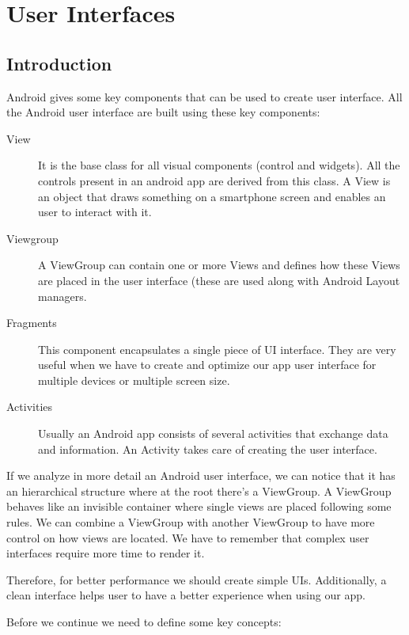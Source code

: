 \chapter{User Interfaces}

\section{Introduction}
Android gives some key components that can be used to create user interface. All the Android user interface are built using these key components:

\begin{description}
	\item[View] It is the base class for all visual components (control and widgets). All the controls present in an android app are derived
	from this class. A View is an object that draws something on a smartphone screen and enables an user to interact with it.
	\item[Viewgroup] A ViewGroup can contain one or more Views and defines how these Views are placed in the user interface
	(these are used along with Android Layout managers.
	\item[Fragments] This component encapsulates a single piece of UI interface. They are very useful
	when we have to create and optimize our app user interface for multiple devices or multiple screen size.
	\item[Activities] Usually an Android app consists of several activities that exchange data and information. An Activity takes
	care of creating the user interface.
\end{description}

If we analyze in more detail an Android user interface, we can notice that it has an hierarchical structure where at the root there's
a ViewGroup. A ViewGroup behaves like an invisible container where single views are placed following some rules. We
can combine a ViewGroup with another ViewGroup to have more control on how views are located. We have to remember that complex user interfaces require more time to render it. 

\begin{framed}
Therefore, for better performance we should create
simple UIs.  Additionally, a clean interface helps user to have a better experience when using our app.	
\end{framed}


Before we continue we need to define some key concepts:

